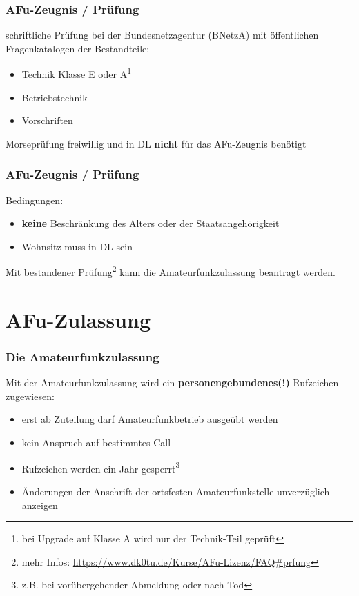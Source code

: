 \begin{frame}
  \frametitle{AFu-Zeugnis / Prüfung}

  schriftliche Prüfung bei der Bundesnetzagentur (BNetzA) mit öffentlichen
  Fragenkatalogen der Bestandteile:

  \begin{itemize}
    \item Technik Klasse E oder A\footnote{bei Upgrade auf Klasse A wird nur
      der Technik-Teil geprüft}
    \item Betriebstechnik
    \item Vorschriften
  \end{itemize}

  \vspace{2em}

  Morseprüfung freiwillig und in DL \textbf{nicht} für das AFu-Zeugnis benötigt

\end{frame}

\begin{frame}
  \frametitle{AFu-Zeugnis / Prüfung}

  Bedingungen:

  \begin{itemize}
    \item \textbf{keine} Beschränkung des Alters oder der Staatsangehörigkeit
    \item Wohnsitz muss in DL sein
  \end{itemize}

  Mit bestandener Prüfung\footnote{mehr Infos: \scriptsize
  \url{https://www.dk0tu.de/Kurse/AFu-Lizenz/FAQ\#prfung}} kann die
  Amateurfunkzulassung beantragt werden.

\end{frame}

\section{AFu-Zulassung}

\begin{frame}
  \frametitle{Die Amateurfunkzulassung}

  Mit der Amateurfunkzulassung wird ein \textbf{personengebundenes(!)}
  Rufzeichen zugewiesen:

  \begin{itemize}
    \item erst ab Zuteilung darf Amateurfunkbetrieb ausgeübt werden
    \item kein Anspruch auf bestimmtes Call
    \item Rufzeichen werden ein Jahr gesperrt\footnote{z.B. bei
      vorübergehender Abmeldung oder nach Tod}
    \item Änderungen der Anschrift der ortsfesten Amateurfunkstelle
      unverzüglich anzeigen
  \end{itemize}

\end{frame}

